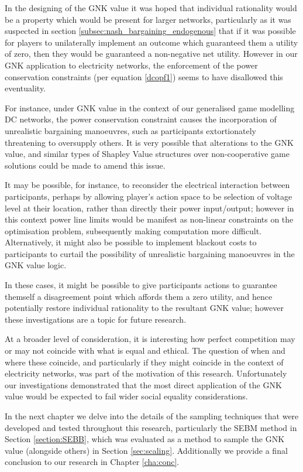 In the designing of the GNK value it was hoped that individual rationality would be a property which would be present for larger networks, particularly as it was suspected in section \ref{subsec:nash_bargaining_endogenous} that if it was possible for players to unilaterally implement an outcome which guaranteed them a utility of zero, then they would be guaranteed a non-negative net utility.
However in our GNK application to electricity networks, the enforcement of the power conservation constraints (per equation \ref{dcopf1}) seems to have disallowed this eventuality.

For instance, under GNK value in the context of our generalised game modelling DC networks, the power conservation constraint causes the incorporation of unrealistic bargaining manoeuvres, such as participants extortionately threatening to oversupply others.
It is very possible that alterations to the GNK value, and similar types of Shapley Value structures over non-cooperative game solutions could be made to amend this issue.

It may be possible, for instance, to reconsider the electrical interaction between participants, perhaps by allowing player's action space to be selection of voltage level at their location, rather than directly their power input/output; however in this context power line limits would be manifest as non-linear constraints on the optimisation problem, subsequently making computation more difficult.
Alternatively, it might also be possible to implement blackout costs to participants to curtail the possibility of unrealistic bargaining manoeuvres in the GNK value logic.

In these cases, it might be possible to give participants actions to guarantee themself a disagreement point which affords them a zero utility, and hence potentially restore individual rationality to the resultant GNK value; however these investigations are a topic for future research.

At a broader level of consideration, it is interesting how perfect competition may or may not coincide with what is equal and ethical.
The question of when and where these coincide, and particularly if they might coincide in the context of electricity networks, was part of the motivation of this research.
Unfortunately our investigations demonstrated that the most direct application of the GNK value would be expected to fail wider social equality considerations.

In the next chapter we delve into the details of the sampling techniques that were developed and tested throughout this research, particularly the \textsc{SEBM} method in Section \ref{section:SEBB}, which was evaluated as a method to sample the GNK value (alongside others) in Section \ref{sec:scaling}.
Additionally we provide a final conclusion to our research in Chapter \ref{cha:conc}. 





